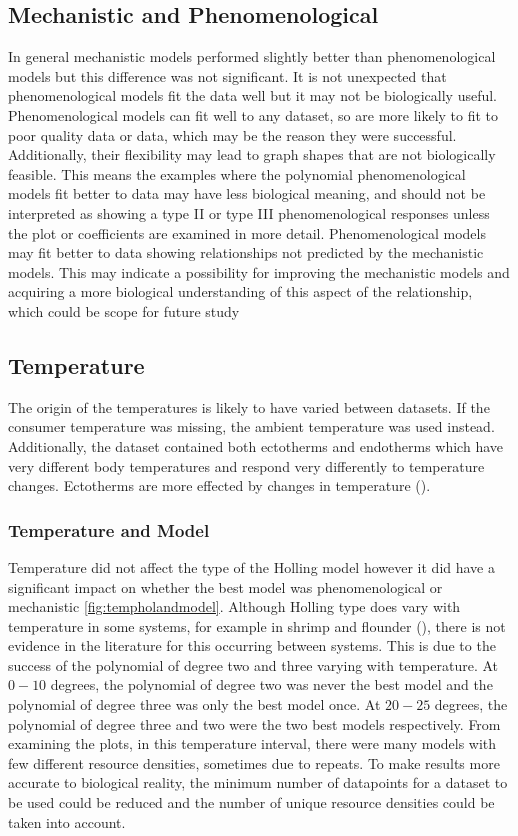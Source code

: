 \documentclass{article}
\begin{document}
\subsection{Mechanistic and Phenomenological }
In general mechanistic models performed slightly better than phenomenological models but this difference was not significant. It is not unexpected that phenomenological models fit the data well but it may not be biologically useful. Phenomenological models can fit well to any dataset, so are more likely to fit to poor quality data or data, which may be the reason they were successful. Additionally, their flexibility may lead to graph shapes that are not biologically feasible. This means the examples where the polynomial phenomenological models fit better to data may have less biological meaning, and should not be interpreted as showing a type II or type III phenomenological responses unless the plot or coefficients are examined in more detail. Phenomenological models may fit better to data showing relationships not predicted by the mechanistic models. This may indicate a possibility for improving the mechanistic models and acquiring a more biological understanding of this aspect of the relationship, which could be scope for future study
\subsection{Temperature}
The origin of the temperatures is likely to have varied between datasets. If the consumer temperature was missing, the ambient temperature was used instead. Additionally, the dataset contained both ectotherms and endotherms which have very different body temperatures and respond very differently to temperature changes. Ectotherms are more effected by changes in temperature (\cite{Dell2014TemperatureStrategy}).
\subsubsection{Temperature and Model}
Temperature did not affect the type of the Holling model however it did have a significant impact on whether the best model was phenomenological or mechanistic \ref{fig:tempholandmodel}.  Although Holling type does vary with temperature in some systems, for example in shrimp and flounder (\cite{Taylor2003EffectAmericanus}), there is not evidence in the literature for this occurring between systems. This is due to the success of the polynomial of degree two and three varying with temperature. At $0-10$ degrees, the polynomial of degree  two was never the best model and the polynomial of degree three was only the best model once. At $20-25$ degrees, the polynomial of degree three and two were the two best models respectively.  From examining the plots, in this temperature interval, there were many models with few different resource densities, sometimes due to repeats. To make results more accurate to biological reality, the minimum number of datapoints for a dataset to be used could be reduced and the number of unique resource densities could be taken into account.
\end{document}
